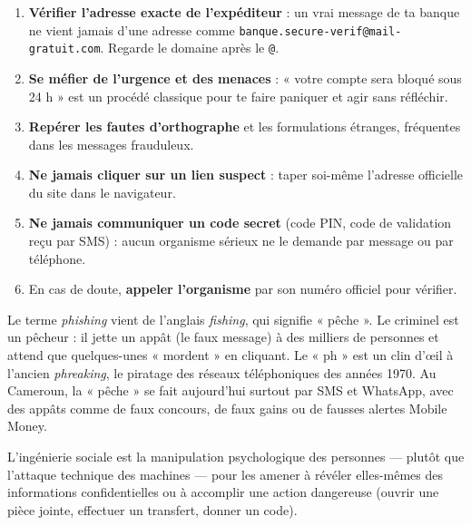 \documentclass[11pt]{article}
\newcommand{\cle}[1]{{\popxbold\color{popdark}#1}}
\newcounter{popsec}
\newcounter{popsub}
\newcommand{\courssub}[1]{%
  \stepcounter{popsub}%
  \par\vspace{9pt}\noindent{\popxbold\fontsize{11.5}{13}\selectfont\color{popink}{\color{poporange}\thepopsec.\thepopsub}\hspace{6pt}#1}\par\nopagebreak\vspace{4pt}
}
\begin{document}
\begin{methode}
\begin{enumerate}
\item \textbf{Vérifier l'adresse exacte de l'expéditeur} : un vrai message de ta banque ne vient jamais d'une adresse comme \texttt{banque.secure-verif@mail-gratuit.com}. Regarde le domaine après le \texttt{@}.
\item \textbf{Se méfier de l'urgence et des menaces} : « votre compte sera bloqué sous 24 h » est un procédé classique pour te faire paniquer et agir sans réfléchir.
\item \textbf{Repérer les fautes d'orthographe} et les formulations étranges, fréquentes dans les messages frauduleux.
\item \textbf{Ne jamais cliquer sur un lien suspect} : taper soi-même l'adresse officielle du site dans le navigateur.
\item \textbf{Ne jamais communiquer un code secret} (code PIN, code de validation reçu par SMS) : aucun organisme sérieux ne le demande par message ou par téléphone.
\item En cas de doute, \textbf{appeler l'organisme} par son numéro officiel pour vérifier.
\end{enumerate}
\end{methode}

\begin{savaistu}
Le terme \emph{phishing} vient de l'anglais \emph{fishing}, qui signifie « pêche ». Le criminel est un pêcheur : il jette un appât (le faux message) à des milliers de personnes et attend que quelques-unes « mordent » en cliquant. Le « ph » est un clin d'œil à l'ancien \emph{phreaking}, le piratage des réseaux téléphoniques des années 1970. Au Cameroun, la « pêche » se fait aujourd'hui surtout par SMS et WhatsApp, avec des appâts comme de faux concours, de faux gains ou de fausses alertes Mobile Money.
\end{savaistu}

\courssub{Ingénierie sociale}

\begin{definition}
L'\cle{ingénierie sociale} est la manipulation psychologique des personnes — plutôt que l'attaque technique des machines — pour les amener à révéler elles-mêmes des informations confidentielles ou à accomplir une action dangereuse (ouvrir une pièce jointe, effectuer un transfert, donner un code).
\end{definition}
\end{document}

